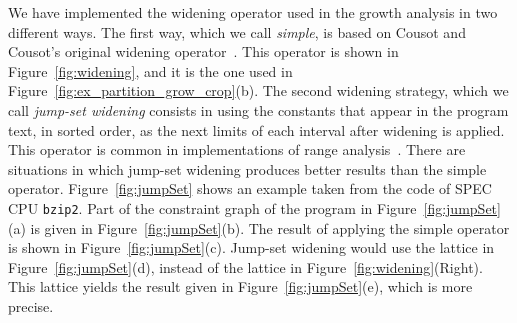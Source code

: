 \documentclass{llncs}
\begin{document}
We have implemented the widening operator used in the growth analysis in
two different ways.
The first way, which we call {\em simple}, is based on Cousot and
Cousot's original widening operator~\cite{Cousot77}.
This operator is shown in Figure~\ref{fig:widening}, and it is the one
used in Figure~\ref{fig:ex_partition_grow_crop}(b).
The second widening strategy, which we call {\em jump-set widening} consists
in using the constants that appear in the program text, in sorted order, as
the next limits of each interval after widening is applied.
This operator is common in implementations of range
analysis~\cite[p.228]{Nielson99}.
There are situations in which jump-set widening produces better results
than the simple operator.
Figure~\ref{fig:jumpSet} shows an example taken from the code of
SPEC CPU \texttt{bzip2}.
Part of the constraint graph of the program in Figure~\ref{fig:jumpSet}(a)
is given in Figure~\ref{fig:jumpSet}(b).
The result of applying the simple operator is shown in
Figure~\ref{fig:jumpSet}(c).
Jump-set widening would use the lattice in Figure~\ref{fig:jumpSet}(d),
instead of the lattice in Figure~\ref{fig:widening}(Right).
This lattice yields the result given in Figure~\ref{fig:jumpSet}(e),
which is more precise.
\end{document}
